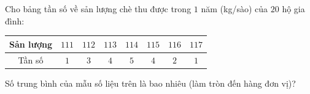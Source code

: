 \begin{ex}
Cho bảng tần số về sản lượng chè thu được trong $1$ năm (kg/sào) của $20$ hộ gia đình:
\begin{center}
\begin{tabular}{|c|c|c|c|c|c|c|c|}\hline
Sản lượng & $111$ & $112$ & $113$ & $114$ & $115$ & $116$ & $117$\\\hline
Tần số & $1$ & $3$ & $4$ & $5$ & $4$ & $2$ & $1$\\\hline
\end{tabular}
\end{center}
Số trung bình của mẫu số liệu trên là bao nhiêu (làm tròn đến hàng đơn vị)?
\end{ex}
